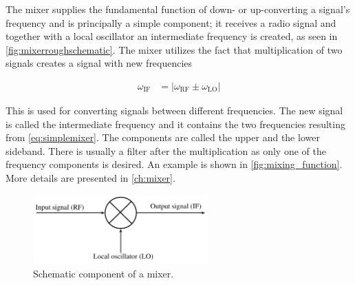 			The mixer supplies the fundamental function of down- or up-converting a signal's frequency and is principally a simple component; it receives a radio signal and together with a local oscillator an intermediate frequency is created, as seen in \autoref{fig:mixerroughschematic}. The mixer utilizes the fact that multiplication of two signals creates a signal with new frequencies
	
			\begin{align}\label{eq:simplemixer}
				\omega_\text{IF} &= |\omega_\text{RF}\pm\omega_\text{LO}|
			\end{align}
			
			This is used for converting signals between different frequencies. The new signal is called the intermediate frequency and it contains the two frequencies resulting from \autoref{eq:simplemixer}. The components are called the upper and the lower sideband. There is usually a filter after the multiplication as only one of the frequency components is desired. An example is shown in \autoref{fig:mixing_function}. More details are presented in \autoref{ch:mixer}.
				
			\begin{figure}[hbt!]
				\centering
				\includegraphics[width=0.6\textwidth]{fig/mixer/mixer.pdf}
				\caption{Schematic component of a mixer.}\label{fig:mixerroughschematic}
			\end{figure}
	
